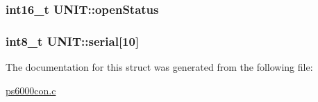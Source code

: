 \subsubsection[{\texorpdfstring{open\+Status}{openStatus}}]{\setlength{\rightskip}{0pt plus 5cm}int16\+\_\+t U\+N\+I\+T\+::open\+Status}\hypertarget{structUNIT_a7bfb87b0c840cf00395e9a33f9d65d4d}{}\label{structUNIT_a7bfb87b0c840cf00395e9a33f9d65d4d}
\subsubsection[{\texorpdfstring{serial}{serial}}]{\setlength{\rightskip}{0pt plus 5cm}int8\+\_\+t U\+N\+I\+T\+::serial\mbox{[}10\mbox{]}}\hypertarget{structUNIT_a8d4ab17004d27b2bd9713d4284a869b9}{}\label{structUNIT_a8d4ab17004d27b2bd9713d4284a869b9}


The documentation for this struct was generated from the following file\+:\begin{DoxyCompactItemize}
\item 
\hyperlink{ps6000con_8c}{ps6000con.\+c}\end{DoxyCompactItemize}
